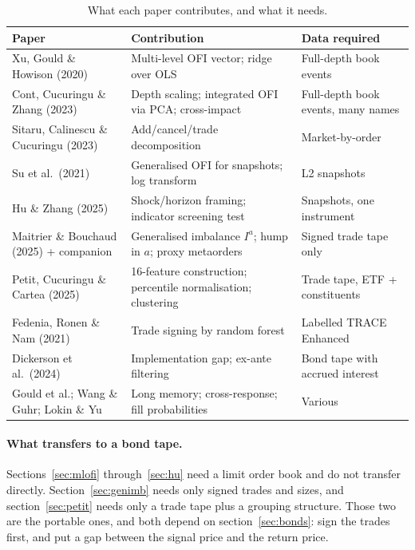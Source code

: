 \documentclass[11pt]{article}
\begin{document}
\begin{table}[h]
\centering
\captionsetup{font=small}
\caption{What each paper contributes, and what it needs.}
\small
\begin{tabular}{p{4.2cm}p{5.2cm}p{4.6cm}}
\toprule
Paper & Contribution & Data required \\
\midrule
Xu, Gould \& Howison (2020) & Multi-level OFI vector; ridge over OLS & Full-depth book events \\
Cont, Cucuringu \& Zhang (2023) & Depth scaling; integrated OFI via PCA; cross-impact & Full-depth book events, many names \\
Sitaru, Calinescu \& Cucuringu (2023) & Add/cancel/trade decomposition & Market-by-order \\
Su et al.\ (2021) & Generalised OFI for snapshots; log transform & L2 snapshots \\
Hu \& Zhang (2025) & Shock/horizon framing; indicator screening test & Snapshots, one instrument \\
Maitrier \& Bouchaud (2025) + companion & Generalised imbalance $I^a$; hump in $a$; proxy metaorders & Signed trade tape only \\
Petit, Cucuringu \& Cartea (2025) & 16-feature construction; percentile normalisation; clustering & Trade tape, ETF + constituents \\
Fedenia, Ronen \& Nam (2021) & Trade signing by random forest & Labelled TRACE Enhanced \\
Dickerson et al.\ (2024) & Implementation gap; ex-ante filtering & Bond tape with accrued interest \\
Gould et al.; Wang \& Guhr; Lokin \& Yu & Long memory; cross-response; fill probabilities & Various \\
\bottomrule
\end{tabular}
\end{table}

\paragraph{What transfers to a bond tape.} Sections~\ref{sec:mlofi}
through~\ref{sec:hu} need a limit order book and do not transfer directly.
Section~\ref{sec:genimb} needs only signed trades and sizes, and
section~\ref{sec:petit} needs only a trade tape plus a grouping structure. Those
two are the portable ones, and both depend on section~\ref{sec:bonds}: sign the
trades first, and put a gap between the signal price and the return price.
\end{document}
